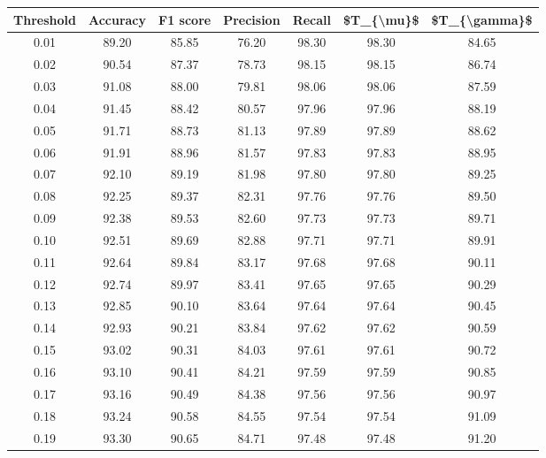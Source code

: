 \begin{tabular}{|c|c|c|c|c|c|c|}
\hline
 Threshold &  Accuracy &  F1 score &  Precision &  Recall &  \$T\_\{\textbackslash mu\}\$ &  \$T\_\{\textbackslash gamma\}\$ \\
\hline
      0.01 &     89.20 &     85.85 &      76.20 &   98.30 &      98.30 &         84.65 \\
      0.02 &     90.54 &     87.37 &      78.73 &   98.15 &      98.15 &         86.74 \\
      0.03 &     91.08 &     88.00 &      79.81 &   98.06 &      98.06 &         87.59 \\
      0.04 &     91.45 &     88.42 &      80.57 &   97.96 &      97.96 &         88.19 \\
      0.05 &     91.71 &     88.73 &      81.13 &   97.89 &      97.89 &         88.62 \\
      0.06 &     91.91 &     88.96 &      81.57 &   97.83 &      97.83 &         88.95 \\
      0.07 &     92.10 &     89.19 &      81.98 &   97.80 &      97.80 &         89.25 \\
      0.08 &     92.25 &     89.37 &      82.31 &   97.76 &      97.76 &         89.50 \\
      0.09 &     92.38 &     89.53 &      82.60 &   97.73 &      97.73 &         89.71 \\
      0.10 &     92.51 &     89.69 &      82.88 &   97.71 &      97.71 &         89.91 \\
      0.11 &     92.64 &     89.84 &      83.17 &   97.68 &      97.68 &         90.11 \\
      0.12 &     92.74 &     89.97 &      83.41 &   97.65 &      97.65 &         90.29 \\
      0.13 &     92.85 &     90.10 &      83.64 &   97.64 &      97.64 &         90.45 \\
      0.14 &     92.93 &     90.21 &      83.84 &   97.62 &      97.62 &         90.59 \\
      0.15 &     93.02 &     90.31 &      84.03 &   97.61 &      97.61 &         90.72 \\
      0.16 &     93.10 &     90.41 &      84.21 &   97.59 &      97.59 &         90.85 \\
      0.17 &     93.16 &     90.49 &      84.38 &   97.56 &      97.56 &         90.97 \\
      0.18 &     93.24 &     90.58 &      84.55 &   97.54 &      97.54 &         91.09 \\
      0.19 &     93.30 &     90.65 &      84.71 &   97.48 &      97.48 &         91.20 \\

\end{tabular}
